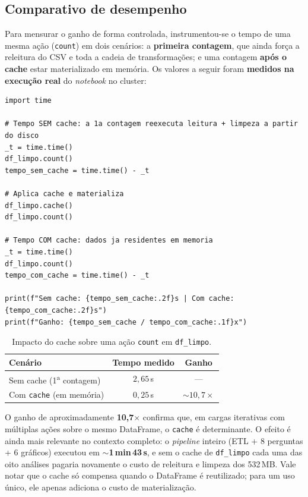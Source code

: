 \subsection{Comparativo de desempenho}

Para mensurar o ganho de forma controlada, instrumentou-se o tempo de uma mesma ação
(\texttt{count}) em dois cenários: a \textbf{primeira contagem}, que ainda força a
releitura do CSV e toda a cadeia de transformações; e uma contagem \textbf{após o cache}
estar materializado em memória. Os valores a seguir foram \textbf{medidos na execução
real} do \textit{notebook} no cluster:

\begin{lstlisting}[caption={Benchmark de cache executado no cluster.},label={lst:bench}]
import time

# Tempo SEM cache: a 1a contagem reexecuta leitura + limpeza a partir do disco
_t = time.time()
df_limpo.count()
tempo_sem_cache = time.time() - _t

# Aplica cache e materializa
df_limpo.cache()
df_limpo.count()

# Tempo COM cache: dados ja residentes em memoria
_t = time.time()
df_limpo.count()
tempo_com_cache = time.time() - _t

print(f"Sem cache: {tempo_sem_cache:.2f}s | Com cache: {tempo_com_cache:.2f}s")
print(f"Ganho: {tempo_sem_cache / tempo_com_cache:.1f}x")
\end{lstlisting}

\begin{table}[H]
  \centering
  \begin{tabular}{lcc}
    \toprule
    \textbf{Cenário} & \textbf{Tempo medido} & \textbf{Ganho} \\
    \midrule
    Sem cache (1\textsuperscript{a} contagem) & $2{,}65$\,s & --- \\
    Com \texttt{cache} (em memória)            & $0{,}25$\,s & $\sim 10{,}7\times$ \\
    \bottomrule
  \end{tabular}
  \caption{Impacto do cache sobre uma ação \texttt{count} em \texttt{df\_limpo}.}
  \label{tab:cache}
\end{table}

O ganho de aproximadamente \textbf{10,7$\times$} confirma que, em cargas iterativas com
múltiplas ações sobre o mesmo DataFrame, o \texttt{cache} é determinante. O efeito é ainda
mais relevante no contexto completo: o \textit{pipeline} inteiro (ETL + 8 perguntas + 6
gráficos) executou em $\sim$\textbf{1\,min\,43\,s}, e sem o cache de \texttt{df\_limpo}
cada uma das oito análises pagaria novamente o custo de releitura e limpeza dos 532\,MB.
Vale notar que o cache só compensa quando o DataFrame é reutilizado; para um uso único,
ele apenas adiciona o custo de materialização.

